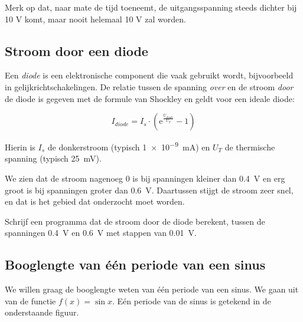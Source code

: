 \documentclass[a4paper,10pt,fleqn,twoside]{article}
\begin{document}
Merk op dat, naar mate de tijd toeneemt, de uitgangsspanning steeds dichter bij 10 V komt, maar nooit helemaal 10 V zal worden.

\subsection{Stroom door een diode}
Een \textsl{diode} is een elektronische component die vaak gebruikt wordt, bijvoorbeeld in gelijkrichtschakelingen. De relatie tussen de spanning \textsl{over} en de stroom \textsl{door} de diode is gegeven met de formule van Shockley en geldt voor een ideale diode:

\begin{equation}
I_{diode} = I_s\cdot(\mathrm{e}^{\frac{U_{diode}}{U_T}}-1)
\end{equation}

Hierin is $I_s$ de donkerstroom (typisch \SI{1e-9}{\milli\ampere}) en $U_T$ de thermische spanning (typisch \SI{25}{\milli\volt}).


\begin{figure}[!ht]
\centering
{}
\end{figure}

We zien dat de stroom nagenoeg 0 is bij spanningen kleiner dan \SI{0.4}{\volt} en erg groot is bij spanningen groter dan \SI{0.6}{\volt}. Daartussen stijgt de stroom zeer snel, en dat is het gebied dat onderzocht moet worden.

Schrijf een programma dat de stroom door de diode berekent, tussen de spanningen \SI{0.4}{\volt} en \SI{0.6}{\volt} met stappen van \SI{0.01}{\volt}.

\subsection{Booglengte van één periode van een sinus}
We willen graag de booglengte weten van één periode van een sinus. We gaan uit van de functie $f(x) = \sin x$. Eén periode van de sinus is getekend in de onderstaande figuur.
\end{document}
